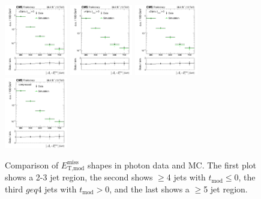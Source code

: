 \begin{figure}[htb]
\centering
\includegraphics[width=0.245\textwidth]{figures/metres_DataVsSim_AB.pdf}
\includegraphics[width=0.245\textwidth]{figures/metres_DataVsSim_CD.pdf}
\includegraphics[width=0.245\textwidth]{figures/metres_DataVsSim_EFGH.pdf}
\includegraphics[width=0.245\textwidth]{figures/metres_DataVsSim_I.pdf}
\caption{Comparison of $E_\text{T,mod}^\text{miss}$ shapes in photon
  data and MC. The first plot shows a 2-3 jet region, the second shows
  $\geq$4 jets with $t_\text{mod}\leq$0, the third $geq$4 jets with
  $t_\text{mod}>$0, and the last shows a $\geq$5 jet region.}
\label{fig:metres:datamcratio}
\end{figure}

